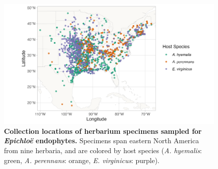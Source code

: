 \documentclass[11pt]{article}
\newcommand{\revise}[1]{{\color{black}{#1}}}
\begin{document}
\begin{figure}[h]
	\centering
	\includegraphics[width = \linewidth]{../Plots/collections_map.png}
	\caption[Collection locations of herbarium specimens sampled for \emph{Epichloë} endophytes]{\textbf{Collection locations of herbarium specimens sampled for \emph{Epichloë} endophytes.} Specimens span eastern North America from nine herbaria, and are colored by host species (\emph{A. hyemalis}: green, \emph{A. perennans}: orange, \emph{E. virginicus}: purple). \revise{Map lines delineate study areas and do not necessarily depict accepted national boundaries.}}
	\label{fig:map}
\end{figure}
\end{document}
